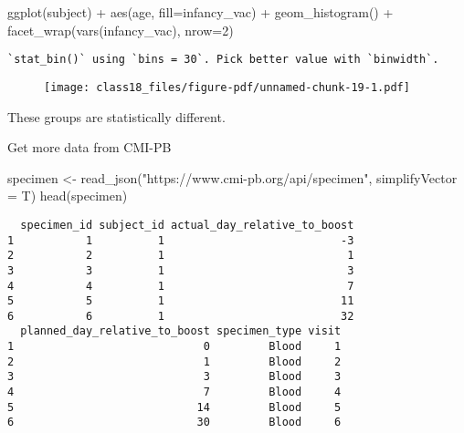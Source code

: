 \documentclass[
  letterpaper,
  DIV=11,
  numbers=noendperiod]{scrartcl}
\newenvironment{Shaded}{\begin{snugshade}}{\end{snugshade}}
\newcommand{\AttributeTok}[1]{\textcolor[rgb]{0.40,0.45,0.13}{#1}}
\newcommand{\DecValTok}[1]{\textcolor[rgb]{0.68,0.00,0.00}{#1}}
\newcommand{\FunctionTok}[1]{\textcolor[rgb]{0.28,0.35,0.67}{#1}}
\newcommand{\NormalTok}[1]{\textcolor[rgb]{0.00,0.23,0.31}{#1}}
\newcommand{\OtherTok}[1]{\textcolor[rgb]{0.00,0.23,0.31}{#1}}
\newcommand{\SpecialCharTok}[1]{\textcolor[rgb]{0.37,0.37,0.37}{#1}}
\newcommand{\StringTok}[1]{\textcolor[rgb]{0.13,0.47,0.30}{#1}}
\begin{document}
\begin{Shaded}
\begin{Highlighting}[]
\FunctionTok{ggplot}\NormalTok{(subject) }\SpecialCharTok{+}
  \FunctionTok{aes}\NormalTok{(age, }\AttributeTok{fill=}\NormalTok{infancy\_vac) }\SpecialCharTok{+}
  \FunctionTok{geom\_histogram}\NormalTok{() }\SpecialCharTok{+}
  \FunctionTok{facet\_wrap}\NormalTok{(}\FunctionTok{vars}\NormalTok{(infancy\_vac), }\AttributeTok{nrow=}\DecValTok{2}\NormalTok{)}
\end{Highlighting}
\end{Shaded}

\begin{verbatim}
`stat_bin()` using `bins = 30`. Pick better value with `binwidth`.
\end{verbatim}

\begin{figure}[H]

{\centering \texttt{[image: class18\_files/figure-pdf/unnamed-chunk-19-1.pdf]}

}

\end{figure}

These groups are statistically different.

Get more data from CMI-PB

\begin{Shaded}
\begin{Highlighting}[]
\NormalTok{specimen }\OtherTok{\textless{}{-}} \FunctionTok{read\_json}\NormalTok{(}\StringTok{"https://www.cmi{-}pb.org/api/specimen"}\NormalTok{, }\AttributeTok{simplifyVector =}\NormalTok{ T)}
\FunctionTok{head}\NormalTok{(specimen)}
\end{Highlighting}
\end{Shaded}

\begin{verbatim}
  specimen_id subject_id actual_day_relative_to_boost
1           1          1                           -3
2           2          1                            1
3           3          1                            3
4           4          1                            7
5           5          1                           11
6           6          1                           32
  planned_day_relative_to_boost specimen_type visit
1                             0         Blood     1
2                             1         Blood     2
3                             3         Blood     3
4                             7         Blood     4
5                            14         Blood     5
6                            30         Blood     6
\end{verbatim}
\end{document}
